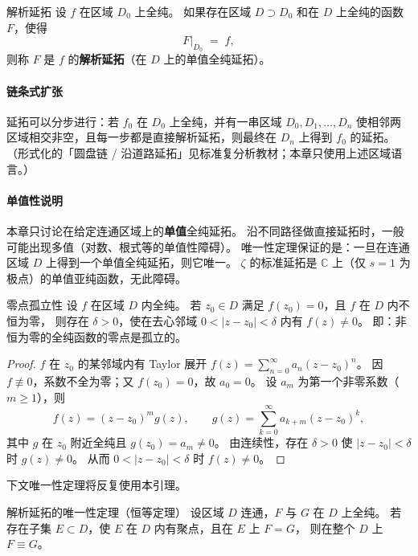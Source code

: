 \begin{definition}{解析延拓}{}
设 $f$ 在区域 $D_0$ 上全纯。
如果存在区域 $D\supset D_0$ 和在 $D$ 上全纯的函数 $F$，使得
\[
F|_{D_0} \;=\; f,
\]
则称 $F$ 是 $f$ 的\textbf{解析延拓}（在 $D$ 上的单值全纯延拓）。
\end{definition}

\paragraph{链条式扩张}
延拓可以分步进行：若 $f_0$ 在 $D_0$ 上全纯，并有一串区域 $D_0,D_1,\ldots,D_n$
使相邻两区域相交非空，且每一步都是直接解析延拓，则最终在 $D_n$ 上得到 $f_0$ 的延拓。
（形式化的「圆盘链 / 沿道路延拓」见标准复分析教材；本章只使用上述区域语言。）

\paragraph{单值性说明}
本章只讨论在给定连通区域上的\textbf{单值}全纯延拓。
沿不同路径做直接延拓时，一般可能出现多值（对数、根式等的单值性障碍）。
唯一性定理保证的是：一旦在连通区域 $D$ 上得到一个单值全纯延拓，则它唯一。
$\zeta$ 的标准延拓是 $\mathbb{C}$ 上（仅 $s=1$ 为极点）的单值亚纯函数，无此障碍。

\begin{lemma}{零点孤立性}{}
设 $f$ 在区域 $D$ 内全纯。
若 $z_0\in D$ 满足 $f(z_0)=0$，且 $f$ 在 $D$ 内不恒为零，
则存在 $\delta>0$，使在去心邻域 $0<|z-z_0|<\delta$ 内有 $f(z)\neq 0$。
即：非恒为零的全纯函数的零点是孤立的。
\end{lemma}

\begin{proof}
$f$ 在 $z_0$ 的某邻域内有 Taylor 展开 $f(z)=\sum_{n=0}^\infty a_n(z-z_0)^n$。
因 $f\not\equiv 0$，系数不全为零；又 $f(z_0)=0$，故 $a_0=0$。
设 $a_m$ 为第一个非零系数（$m\ge 1$），则
\[
f(z)=(z-z_0)^m g(z),\qquad
g(z)=\sum_{k=0}^\infty a_{k+m}(z-z_0)^k,
\]
其中 $g$ 在 $z_0$ 附近全纯且 $g(z_0)=a_m\neq 0$。
由连续性，存在 $\delta>0$ 使 $|z-z_0|<\delta$ 时 $g(z)\neq 0$。
从而 $0<|z-z_0|<\delta$ 时 $f(z)\neq 0$。
\end{proof}

\noindent
下文唯一性定理将反复使用本引理。

\begin{theorem}{解析延拓的唯一性定理（恒等定理）}{}
设区域 $D$ 连通，$F$ 与 $G$ 在 $D$ 上全纯。
若存在子集 $E\subset D$，使 $E$ 在 $D$ 内有聚点，且在 $E$ 上 $F=G$，
则在整个 $D$ 上 $F\equiv G$。
\end{theorem}

